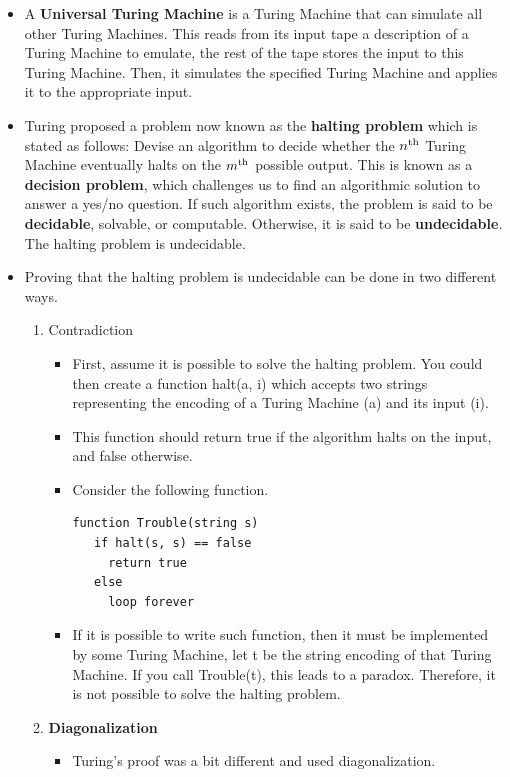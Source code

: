 \documentclass{article}
\begin{document}
\begin{itemize}
    \item A \textbf{Universal Turing Machine} is a Turing Machine that can simulate all other Turing Machines. This reads from its input tape a description of a Turing Machine to emulate, the rest of the tape stores the input to this Turing Machine. Then, it simulates the specified Turing Machine and applies it to the appropriate input.
    \item Turing proposed a problem now known as the \textbf{halting problem} which is stated as follows: Devise an algorithm to decide whether the \(n^\textnormal{th}\) Turing Machine eventually halts on the \(m^\textnormal{th}\) possible output. This is known as a \textbf{decision problem}, which challenges us to find an algorithmic solution to answer a yes/no question. If such algorithm exists, the problem is said to be \textbf{decidable}, solvable, or computable. Otherwise, it is said to be \textbf{undecidable}. The halting problem is undecidable.
    \item Proving that the halting problem is undecidable can be done in two different ways.
    \begin{enumerate}
        \item Contradiction
        \begin{itemize}
            \item First, assume it is possible to solve the halting problem. You could then create a function halt(a, i) which accepts two strings representing the encoding of a Turing Machine (a) and its input (i).
            \item This function should return true if the algorithm halts on the input, and false otherwise.
            \item Consider the following function.
\begin{verbatim}
function Trouble(string s)
   if halt(s, s) == false
     return true
   else
     loop forever
\end{verbatim}
            \item If it is possible to write such function, then it must be implemented by some Turing Machine, let t be the string encoding of that Turing Machine. If you call Trouble(t), this leads to a paradox. Therefore, it is not possible to solve the halting problem.
        \end{itemize}
        \item \textbf{Diagonalization}
        \begin{itemize}
            \item Turing's proof was a bit different and used diagonalization.

\end{itemize}
\end{enumerate}
\end{itemize}
\end{document}
